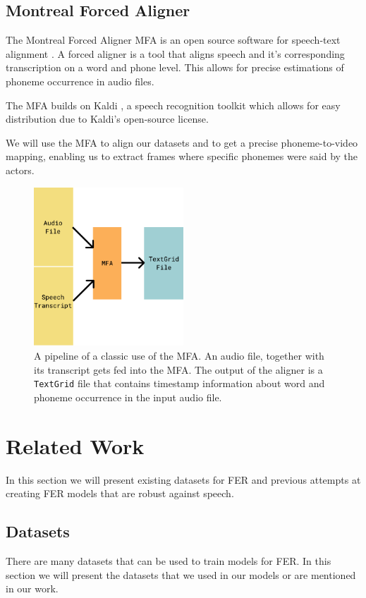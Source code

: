 \subsection{Montreal Forced Aligner}
\label{sub:mfa}
The Montreal Forced Aligner MFA is an open source software for speech-text alignment \cite{mcauliffe2017montreal}. A forced aligner is a tool that aligns speech and it's corresponding transcription on a word and phone level. This allows for precise estimations of phoneme occurrence in audio files.

The MFA builds on Kaldi \cite{povey2011kaldi}, a speech recognition toolkit which allows for easy distribution due to Kaldi's open-source license.

We will use the MFA to align our datasets and to get a precise phoneme-to-video mapping, enabling us to extract frames where specific phonemes were said by the actors.

\begin{figure}
    \centering
    \includegraphics[width=0.5\textwidth]{res/mfa.pdf}
    \caption{A pipeline of a classic use of the MFA. An audio file, together with its transcript gets fed into the MFA. The output of the aligner is a \texttt{TextGrid} file that contains timestamp information about word and phoneme occurrence in the input audio file.}
    \label{fig:mfa}
\end{figure}
\section{Related Work}
In this section we will present existing datasets for FER and previous attempts at creating FER models that are robust against speech.

\subsection{Datasets}
There are many datasets that can be used to train models for FER. In this section we will present the datasets that we used in our models or are mentioned in our work.
